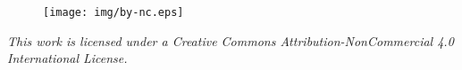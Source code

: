 




\newpage
\thispagestyle{empty}

\mbox{}
\vfill    
\begin{figure}[H]
    \texttt{[image: img/by-nc.eps]}
\end{figure}
\textit{This work is licensed under a Creative Commons Attribution-NonCommercial 4.0 International License.}
